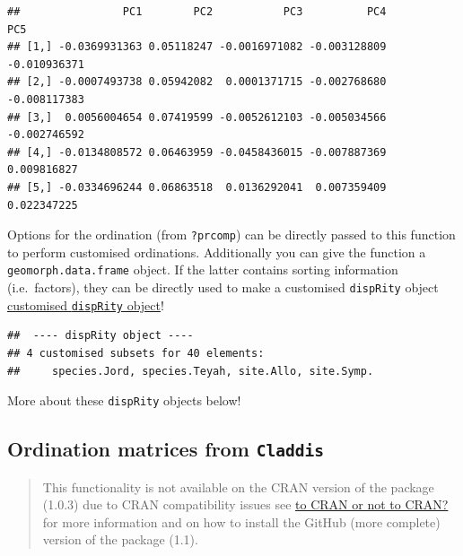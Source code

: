 \documentclass[]{book}
\newenvironment{Shaded}{\begin{snugshade}}{\end{snugshade}}
\newcommand{\KeywordTok}[1]{\textcolor[rgb]{0.13,0.29,0.53}{\textbf{#1}}}
\newcommand{\DataTypeTok}[1]{\textcolor[rgb]{0.13,0.29,0.53}{#1}}
\newcommand{\StringTok}[1]{\textcolor[rgb]{0.31,0.60,0.02}{#1}}
\newcommand{\OperatorTok}[1]{\textcolor[rgb]{0.81,0.36,0.00}{\textbf{#1}}}
\newcommand{\NormalTok}[1]{#1}
\theoremstyle{definition}
\theoremstyle{definition}
\theoremstyle{remark}
\begin{document}
\begin{verbatim}
##                PC1        PC2           PC3          PC4          PC5
## [1,] -0.0369931363 0.05118247 -0.0016971082 -0.003128809 -0.010936371
## [2,] -0.0007493738 0.05942082  0.0001371715 -0.002768680 -0.008117383
## [3,]  0.0056004654 0.07419599 -0.0052612103 -0.005034566 -0.002746592
## [4,] -0.0134808572 0.06463959 -0.0458436015 -0.007887369  0.009816827
## [5,] -0.0334696244 0.06863518  0.0136292041  0.007359409  0.022347225
\end{verbatim}

Options for the ordination (from \texttt{?prcomp}) can be directly
passed to this function to perform customised ordinations. Additionally
you can give the function a \texttt{geomorph.data.frame} object. If the
latter contains sorting information (i.e.~factors), they can be directly
used to make a customised \texttt{dispRity} object
\protect\hyperlink{customised-subsets}{customised \texttt{dispRity}
object}!

\begin{Shaded}
\end{Shaded}

\begin{verbatim}
##  ---- dispRity object ---- 
## 4 customised subsets for 40 elements:
##     species.Jord, species.Teyah, site.Allo, site.Symp.
\end{verbatim}

More about these \texttt{dispRity} objects below!

\hypertarget{Claddis-ordination}{\subsection{\texorpdfstring{Ordination
matrices from
\texttt{Claddis}}{Ordination matrices from Claddis}}\label{Claddis-ordination}}

\begin{quote}
This functionality is not available on the CRAN version of the package
(1.0.3) due to CRAN compatibility issues see
\protect\hyperlink{noCRAN}{to CRAN or not to CRAN?} for more information
and on how to install the GitHub (more complete) version of the package
(1.1).
\end{quote}
\end{document}
